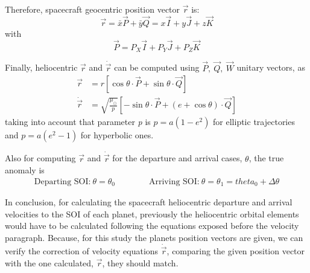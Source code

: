 Therefore, spacecraft geocentric position vector $\vec{r}$ is:
\begin{equation}
	\vec{r} = \bar{x}\vec{P}+\bar{y}\vec{Q} = x\vec{I}+y\vec{J}+z\vec{K}
\end{equation}
with
\begin{equation}
	\vec{P}=P_X\vec{I}+P_Y\vec{J}+P_Z\vec{K}
\end{equation}

Finally, heliocentric $\vec{r}$ and $\dot{\vec{r}}$ can be computed using $\vec{P},\ \vec{Q},\ \vec{W}$ unitary vectors, as
\begin{align}
	\vec{r} &= r[\cos\theta\cdot\vec{P}+\sin\theta\cdot\vec{Q}]\\
	\dot{\vec{r}} &= \sqrt{\frac{\mu_\odot}{p}}[-\sin\theta\cdot\vec{P}+(e+\cos\theta)\cdot\vec{Q}]
\end{align}
taking into account that parameter \textit{p} is $p = a(1-e^2)$ for elliptic trajectories and $p = a(e^2-1)$ for hyperbolic ones.

Also for computing $\vec{r}$ and $\dot{\vec{r}}$ for the departure and arrival cases, $\theta$, the true anomaly is
\begin{align*}
	\text{Departing SOI:}\ \theta = \theta_0 \qquad\qquad \text{Arriving SOI:}\ \theta = \theta_1 = theta_0 + \Delta\theta 
\end{align*}

In conclusion, for calculating the spacecraft heliocentric departure and arrival velocities to the SOI of each planet, previously the heliocentric orbital elements would have to be calculated following the equations exposed before the velocity paragraph. Because, for this study the planets position vectors are given, we can verify the correction of velocity equations $\dot{\vec{r}}$, comparing the given position vector with the one calculated,  $\vec{r}$, they should match. 

